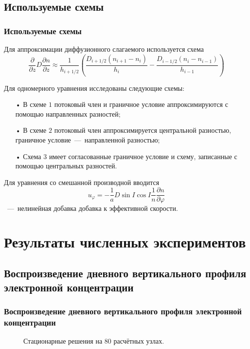 \documentclass[9pt, apectratio=43,unicode]{beamer}
\begin{document}
\subsection{Используемые схемы}
\begin{frame}\frametitle{Используемые схемы}
Для аппроксимации диффузионного слагаемого используется схема $$\dfrac{\partial}{\partial z}D\dfrac{\partial n}{\partial z} \approx \dfrac{1}{h_{i+1/2}}\left(\dfrac{D_{i+1/2}(n_{i+1}-n_i)}{h_i}-\dfrac{D_{i-1/2}(n_{i}-n_{i-1})}{h_{i-1}}\right)$$

Для одномерного уравнения исследованы следующие схемы:

\begin{itemize}
\item[•] В схеме $1$ потоковый член и граничное условие аппроксимируются с помощью направленных разностей; 
\item[•] В схеме $2$ потоковый член аппроксимируется центральной разностью, граничное условие~---~направленной разностью;
\item[•] Схема $3$ имеет согласованные граничное условие и схему, записанные с помощью центральных разностей.
\end{itemize}

Для уравнения со смешанной производной вводится $$u_\varphi=-\dfrac{1}{a}D\sin I \cos I\dfrac{1}{n}\dfrac{\partial n}{\partial \varphi}$$~---~нелинейная добавка добавка к эффективной скорости.

\end{frame}


\section{Результаты численных экспериментов}
\subsection{Воспроизведение дневного вертикального профиля электронной концентрации}
\begin{frame}\frametitle{Воспроизведение дневного вертикального профиля электронной концентрации}

\begin{figure}[H]
\caption{Стационарные решения на $80$ расчётных узлах.}
\end{figure}


\end{frame}
\end{document}
